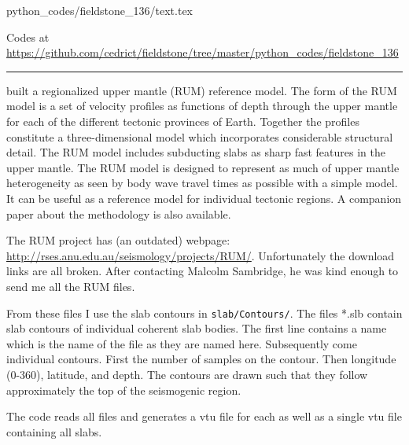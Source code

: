 \begin{flushright} {\tiny {\color{gray} python\_codes/fieldstone\_136/text.tex}} \end{flushright}

%

\begin{center}
\inpython Codes at \url{https://github.com/cedrict/fieldstone/tree/master/python_codes/fieldstone_136}
\end{center}

\par\noindent\rule{\textwidth}{0.4pt}

\parencite{gusa98} built a regionalized upper mantle (RUM) reference model.
The form of the RUM model is a set of velocity
profiles as functions of depth through the upper mantle for each of the different
tectonic provinces of Earth. Together the profiles constitute a three-dimensional
model which incorporates considerable structural detail.
The RUM model includes subducting slabs as sharp fast features in the
upper mantle. The RUM model is designed
to represent as much of upper mantle heterogeneity as seen by body wave travel
times as possible with a simple model. It can be useful as a reference model for
individual tectonic regions. 
A companion paper \parencite{sagu98} about the methodology is also available.

The RUM project has (an outdated) webpage: \url{http://rses.anu.edu.au/seismology/projects/RUM/}.
Unfortunately the download links are all broken. 
After contacting Malcolm Sambridge, he was kind enough to send me all the RUM files. 

From these files I use the slab contours in {\tt slab/Contours/}. 
The files *.slb contain slab contours of individual coherent slab bodies.
The first line contains a name which is the name of the file as they are
named here.  Subsequently come individual contours.  First the number of
samples on the contour.  Then longitude (0-360), latitude, and depth.
The contours are drawn such that they follow approximately the top of
the seismogenic region.

The code reads all files and generates a vtu file for each as well
as a single vtu file containing all slabs. 

